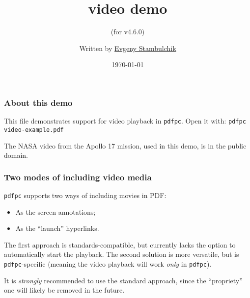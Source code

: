 \documentclass{beamer}
\title{\pdfpc video demo}
\subtitle{(for v4.6.0)}
\author[E. Stambulchik]{Written by
                  \href{https://github.com/fnevgeny}{Evgeny Stambulchik}}
\date{\today}
\institute{}
\newcommand{\pdfpc}{\texttt{pdfpc}\xspace}
\newcommand{\opt}[1]{\texttt{#1}\xspace}
\begin{document}
\begin{frame}
  \titlepage
  \hypertarget{titlePage}{}
\end{frame}

\begin{frame}
  \frametitle{About this demo}

  This file demonstrates support for video playback in \pdfpc.
  Open it with: \opt{pdfpc video-example.pdf}
  
  \vfill
  
  {\small The NASA video from the Apollo 17 mission, used in this demo, is
  in the public domain.}
  
\end{frame}

\begin{frame}
  \frametitle{Two modes of including video media}

  \pdfpc supports two ways of including movies in PDF:

  \begin{itemize}
    \item As the screen annotations;
    \item As the ``launch'' hyperlinks.
  \end{itemize}

  \begin{block}{}
    The first approach is standards-compatible, but currently lacks the option
    to automatically start the playback. The second solution is more versatile,
    but is \pdfpc-specific (meaning the video playback will work {\em only} in
    \pdfpc).
  \end{block}

  \begin{alertblock}{}
    It is {\em strongly} recommended to use the standard approach, since the
    ``propriety'' one will likely be removed in the future.
  \end{alertblock}
\end{frame}
\end{document}
